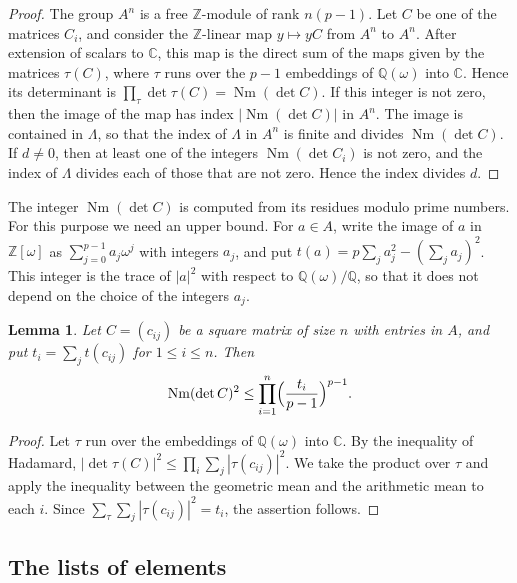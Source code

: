 \documentclass[11pt]{amsart}
\theoremstyle{plain}
\newtheorem{lemma}[theorem]{Lemma}
\theoremstyle{definition}
\begin{document}
\begin{proof}
The group $A^n$ is a free $\mathbb{Z}$-module of rank $n(p-1)$.
Let $C$ be one of the matrices $C_i$, and consider the $\mathbb{Z}$-linear map $y \mapsto yC$ from $A^n$ to $A^n$.
After extension of scalars to $\mathbb{C}$, this map is the direct sum of the maps given by the matrices $\tau(C)$, where $\tau$ runs over the $p - 1$ embeddings of $\mathbb{Q}(\omega)$ into $\mathbb{C}$.
Hence its determinant is $\prod_\tau \det \tau(C) = \operatorname{Nm}(\det C)$.
If this integer is not zero, then the image of the map has index $|\operatorname{Nm}(\det C)|$ in $A^n$.
The image is contained in $\Lambda$, so that the index of $\Lambda$ in $A^n$ is finite and divides $\operatorname{Nm}(\det C)$.
If $d \ne 0$, then at least one of the integers $\operatorname{Nm}(\det C_i)$ is not zero, and the index of $\Lambda$ divides each of those that are not zero.
Hence the index divides $d$.
\end{proof}

The integer $\operatorname{Nm}(\det C)$ is computed from its residues modulo prime numbers.
For this purpose we need an upper bound.
For $a \in A$, write the image of $a$ in $\mathbb{Z}[\omega]$ as $\sum_{j=0}^{p-1} a_j \omega^j$ with integers $a_j$, and put $t(a) = p \sum_j a_j^2 - (\sum_j a_j)^2$.
This integer is the trace of $|a|^2$ with respect to $\mathbb{Q}(\omega)/\mathbb{Q}$, so that it does not depend on the choice of the integers $a_j$.

\begin{lemma} \label{lem:hadamard}
Let $C = (c_{ij})$ be a square matrix of size $n$ with entries in $A$, and put $t_i = \sum_{j} t(c_{ij})$ for $1 \le i \le n$.
Then
\[
\operatorname{Nm}(\det C)^2 \le \prod_{i=1}^{n} \Bigl( \frac{t_i}{p-1} \Bigr)^{p-1} .
\]
\end{lemma}

\begin{proof}
Let $\tau$ run over the embeddings of $\mathbb{Q}(\omega)$ into $\mathbb{C}$.
By the inequality of Hadamard, $|\det \tau(C)|^2 \le \prod_i \sum_j |\tau(c_{ij})|^2$.
We take the product over $\tau$ and apply the inequality between the geometric mean and the arithmetic mean to each $i$.
Since $\sum_\tau \sum_j |\tau(c_{ij})|^2 = t_i$, the assertion follows.
\end{proof}

\subsection{The lists of elements}
\end{document}
